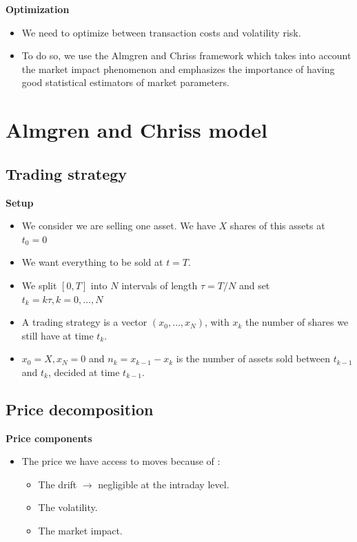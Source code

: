 \documentclass[10pt]{article}
\begin{document}
\textbf{Optimization}

\begin{itemize} 
    \item We need to optimize between transaction costs and volatility risk.
    \item To do so, we use the Almgren and Chriss framework which takes into account the market impact phenomenon and emphasizes the importance of having good statistical estimators of market parameters.
\end{itemize}

\section{Almgren and Chriss model}

\subsection{Trading strategy}

\textbf{Setup}

\begin{itemize} 
    \item We consider we are selling one asset. We have $X$ shares of this assets at $t_{0}=0$
    \item We want everything to be sold at $t=T$.
    \item We split $[0, T]$ into $N$ intervals of length $\tau=T / N$ and set $t_{k}=k \tau, k=0, \ldots, N$
    \item A trading strategy is a vector $\left(x_{0}, \ldots, x_{N}\right)$, with $x_{k}$ the number of shares we still have at time $t_{k}$.
    \item $x_{0}=X, x_{N}=0$ and $n_{k}=x_{k-1}-x_{k}$ is the number of assets sold between $t_{k-1}$ and $t_{k}$, decided at time $t_{k-1}$.
\end{itemize}

\subsection{Price decomposition}

\textbf{Price components}

\begin{itemize} 
    \item The price we have access to moves because of :
    \begin{itemize} 
        \item The drift $\rightarrow$ negligible at the intraday level.
        \item The volatility.
        \item The market impact.
    \end{itemize}
\end{itemize}
\end{document}
